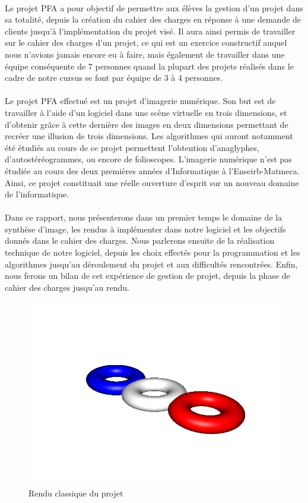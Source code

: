 \paragraph{}
        Le projet PFA a pour objectif de permettre aux élèves la gestion d'un projet dans sa totalité, depuis la création du cahier des charges en réponse à une demande de clients jusqu'à l'implémentation du projet visé. Il aura ainsi permis de travailler sur le cahier des charges d'un projet, ce qui est un exercice constructif auquel nous n'avions jamais encore eu à faire, mais également de travailler dans une équipe conséquente de 7 personnes quand la plupart des projets réalisés dans le cadre de notre cursus se font par équipe de 3 à 4 personnes.

\paragraph{}      
        Le projet PFA effectué est un projet d'imagerie numérique. Son but est de travailler à l'aide d'un logiciel dans une scène virtuelle en trois dimensions, et d'obtenir grâce à cette dernière des images en deux dimensions permettant de recréer une illusion de trois dimensions. Les algorithmes qui auront notamment été étudiés au cours de ce projet permettent l'obtention d'anaglyphes, d'autostéréogrammes, ou encore de folioscopes.
        L'imagerie numérique n'est pas étudiée au cours des deux premières années d'Informatique à l'Enseirb-Matmeca. Ainsi, ce projet constituait une réelle ouverture d'esprit sur un nouveau domaine de l'informatique.
        
\paragraph{}
        Dans ce rapport, nous présenterons dans un premier temps le domaine de la synthèse d'image, les rendus à implémenter dans notre logiciel et les objectifs donnés dans le cahier des charges. Nous parlerons ensuite de la réalisation technique de notre logiciel, depuis les choix effectés pour la programmation et les algorithmes jusqu'au déroulement du projet et aux difficultés rencontrées. Enfin, nous ferons un bilan de cet expérience de gestion de projet, depuis la phase de cahier des charges jusqu'au rendu.

\begin{figure}[h]
	\centering
	\includegraphics[scale=0.4]{3donut_rendu.png}
	\caption{\label{fig:sphère} Rendu classique du projet \protect}
\end{figure}
